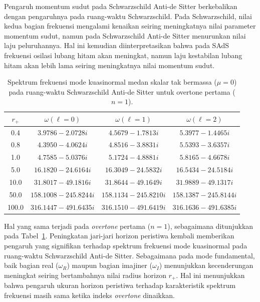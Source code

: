 Pengaruh momentum sudut pada Schwarzschild Anti-de Sitter berkebalikan dengan pengaruhnya pada ruang-waktu Schwarzschild. Pada Schwarzschild, nilai kedua bagian frekuensi mengalami kenaikan seiring meningkatnya nilai parameter momentum sudut, namun pada Schwarzschild Anti-de Sitter menurunkan nilai laju peluruhannya. Hal ini kemudian diinterpretasikan bahwa pada SAdS frekuensi osilasi lubang hitam akan meningkat, namun laju kestabilan lubang hitam akan lebih lama seiring meningkatnya nilai momentum sudut.

\begin{table}[H]
\centering
\caption{Spektrum frekuensi mode kuasinormal medan skalar tak bermassa ($\mu=0$) pada ruang-waktu Schwarzschild Anti-de Sitter untuk overtone pertama ($n=1$).}
\vspace{0.2cm}
\renewcommand{\arraystretch}{1.25}
\begin{tabular}{cccc}
\toprule
$r_+$ & $\omega(\ell=0)$ & $\omega(\ell=1)$ & $\omega(\ell=2)$ \\
\midrule
0.4   & $3.9786 - 2.0728i$ & $4.5679 - 1.7813i$ & $5.3977 - 1.4465i$ \\
0.8   & $4.3950 - 4.0624i$ & $4.8516 - 3.8831i$ & $5.5393 - 3.6357i$ \\
1.0   & $4.7585 - 5.0376i$ & $5.1724 - 4.8881i$ & $5.8165 - 4.6678i$ \\
5.0   & $16.1820 - 24.6164i$ & $16.3049 - 24.5832i$ & $16.5434 - 24.5184i$ \\
10.0  & $31.8017 - 49.1816i$ & $31.8644 - 49.1649i$ & $31.9889 - 49.1317i$ \\
50.0  & $158.1008 - 245.8244i$ & $158.1134 - 245.8210i$ & $158.1387 - 245.8144i$ \\
100.0 & $316.1447 - 491.6435i$ & $316.1510 - 491.6419i$ & $316.1636 - 491.6385i$ \\
\bottomrule
\end{tabular}
\label{tab:sads_mu0_n1}
\end{table}

Hal yang sama terjadi pada \textit{overtone} pertama ($n=1$), sebagaimana ditunjukkan pada Tabel~\ref{tab:sads_mu0_n1}. Peningkatan jari-jari horizon peristiwa kembali memberikan pengaruh yang signifikan terhadap spektrum frekuensi mode kuasinormal pada ruang-waktu Schwarzschild Anti-de Sitter. Sebagaimana pada mode fundamental, baik bagian real ($\omega_R$) maupun bagian imajiner ($\omega_I$) menunjukkan kecenderungan meningkat seiring bertambahnya nilai radius horizon $r_+$. Hal ini menunjukkan bahwa pengaruh ukuran horizon peristiwa terhadap karakteristik spektrum frekuensi masih sama ketika indeks \textit{overtone} dinaikkan.

